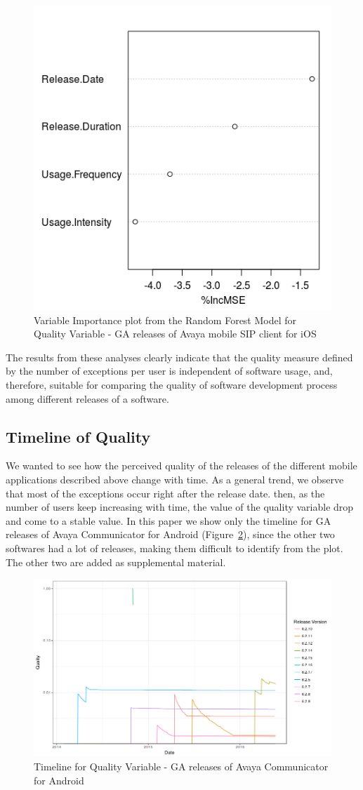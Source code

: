 \documentclass[smallextended]{svjour3}       %
\begin{document}
\begin{figure}[!t]
\centering
\includegraphics[width=0.4\linewidth]{rfqI}
\caption{Variable Importance plot from the Random Forest  Model for Quality Variable - GA releases of Avaya mobile SIP client for iOS}
\label{fig:rf2I}
\end{figure}

The results from these analyses clearly indicate that the quality measure defined by the number of exceptions per user is independent of software usage, and, therefore, suitable for comparing the quality of software development process among different releases of a software.

\subsection{Timeline of Quality}
We wanted to see how the perceived quality of the releases of the different mobile applications described above change with time. As a general trend, we observe that most of the exceptions occur right after the release date. then, as the number of users keep increasing with time, the value of the quality variable drop and come to a stable value.  In this paper we show only the timeline for GA releases of Avaya Communicator for Android (Figure~\ref{fig:tI}), since the other two softwares had a lot of releases, making them difficult to identify from the plot. The other two are added as supplemental material. %

\begin{figure}[!t]
\centering
\includegraphics[width=\linewidth]{timeline_I}
\caption{Timeline for Quality Variable - GA releases of Avaya Communicator for Android}
\label{fig:tI}
\end{figure}
\end{document}
